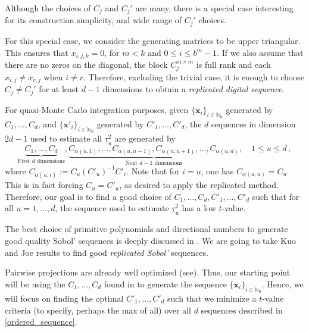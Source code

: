 \documentclass[]{elsarticle}
\theoremstyle{definition}
\newcommand{\bvec}[1]{\boldsymbol{#1}}
\newcommand{\vx}{\bvec{x}}
\begin{document}
 
Although the choices of $C_j$ and $C_j'$ are many, there is a special case interesting for its construction simplicity, and wide range of $C_j'$ choices.

For this special case, we consider the generating matrices to be upper triangular. This ensures that $x_{i,j,k}=0$, for $m<k$ and $0 \leq i \leq b^m-1$. If we also assume that there are no zeros on the diagonal, the block $C_j^{m\times m}$ is full rank and each $x_{i,j}\neq x_{r,j}$ when $i\neq r$. Therefore, excluding the trivial case, it is enough to choose $C_j\neq C_j'$ for at least $d-1$ dimensions to obtain a \emph{replicated digital sequence}. 

For quasi-Monte Carlo integration purposes, given $\{{\vx}_i\}_{i\in\mathbb{N}_0}$ generated by $C_{1},\dots,C_{d}$, and $\{{\vx'}_i\}_{i\in\mathbb{N}_0}$ generated by $C'_{1},\dots,C'_{d}$, the $d$ sequences in dimension $2d-1$ used to estimate all $\underline{\tau}_u^2$ are generated by
\begin{equation}\label{ordered_sequence}
\underbrace{C_{1},\dots,C_{d}}_{\text{First }d\text{ dimensions}},\underbrace{C_{\alpha(u,1)},\dots,C_{\alpha(u,u-1)},C_{\alpha(u,u+1)},\dots,C_{\alpha(u,d)}}_{\text{Next }d-1\text{ dimensions}},\quad 1\leq u \leq d\, ,
\end{equation}
where $C_{\alpha(u,i)}:=C_u(C'_{u})^{-1}C'_{i}$. Note that for $i=u$, one has $C_{\alpha(u,u)}=C_u$. This is in fact forcing $C_u = C'_{u}$, as desired to apply the replicated method. Therefore, our goal is to find a good choice of $C_{1},\dots,C_{d},C'_{1},\dots,C'_{d}$ such that for all $u=1,\dots,d$, the sequence used to estimate $\underline{\tau}_u^2$ has a low $t$-value.

The best choice of primitive polynomials and directional numbers to generate good quality Sobol' sequences is deeply discussed in \cite{kuo}. We are going to take Kuo and Joe results to find  good \emph{replicated Sobol'} sequences.

Pairwise projections are already well optimized (see\cite[Table 2.1]{kuo2}). Thus, our starting point will be using the $C_1,\dots,C_d$ found in \cite{kuo2} to generate the sequence $\{{\vx}_i\}_{i\in\mathbb{N}_0}$. Hence, we will focus on finding the optimal $C'_{1},\dots,C'_{d}$ such that we minimize a $t$-value criteria (to specify, perhaps the max of all) over all $d$ sequences described in \eqref{ordered_sequence}.
\end{document}
